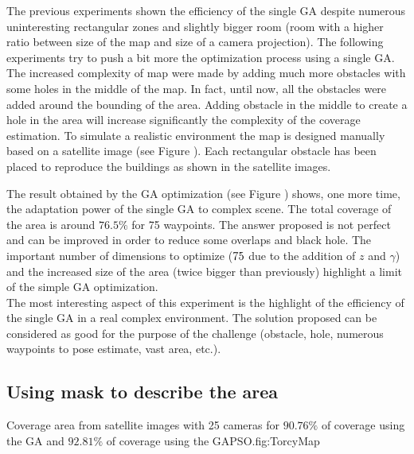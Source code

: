 The previous experiments shown the efficiency of the single GA despite numerous uninteresting rectangular zones and slightly bigger room (room with a higher ratio between size of the map and size of a camera projection). The following experiments try to push a bit more the optimization process using a single GA. The increased complexity of map were made by adding much more obstacles with some holes in the middle of the map. In fact, until now, all the obstacles were added around the bounding of the area. Adding obstacle in the middle to create a hole in the area will increase significantly the complexity of the coverage estimation.
To simulate a realistic environment the map is designed manually based on a satellite image (see Figure ). Each rectangular obstacle has been placed to reproduce the buildings as shown in  the satellite images. 

The result obtained by the GA optimization (see Figure ) shows, one more time, the adaptation power of the single GA to complex scene. The total coverage of the area is around $76.5\%$ for 75 waypoints. The answer proposed is not perfect and can be improved in order to reduce some overlaps and black hole. The important number of dimensions to optimize ($75\time 4$ due to the addition of $z$ and  $\gamma$) and the increased size of the area (twice bigger than previously) highlight a limit of the simple GA optimization.\\
	The most interesting aspect of this experiment is the highlight of the efficiency of the single GA in a real complex environment. The solution proposed can be considered as good for the purpose of the challenge (obstacle, hole, numerous waypoints to pose estimate, vast area, etc.). 
  

	
	\subsection{Using mask to describe the area }\label{sec:maskGAPSO}

\begin{mfigures}[!]
{Coverage area from satellite images with 25 cameras for $90.76\%$ of coverage using the GA and $92.81\%$ of coverage using the GAPSO.}{fig:TorcyMap} \centering
{}
\hspace{1cm}
\hspace{1cm}
\tabsimuposeTorcy
\end{mfigures}


